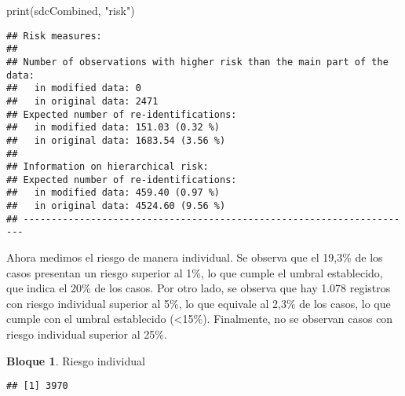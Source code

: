 \documentclass[
]{book}
\newenvironment{Shaded}{\begin{snugshade}}{\end{snugshade}}
\newcommand{\CommentTok}[1]{\textcolor[rgb]{0.56,0.35,0.01}{\textit{#1}}}
\newcommand{\FloatTok}[1]{\textcolor[rgb]{0.00,0.00,0.81}{#1}}
\newcommand{\FunctionTok}[1]{\textcolor[rgb]{0.00,0.00,0.00}{#1}}
\newcommand{\NormalTok}[1]{#1}
\newcommand{\SpecialCharTok}[1]{\textcolor[rgb]{0.00,0.00,0.00}{#1}}
\newcommand{\StringTok}[1]{\textcolor[rgb]{0.31,0.60,0.02}{#1}}
\theoremstyle{definition}
\theoremstyle{definition}
\newtheorem{example}{Bloque}[chapter]
\theoremstyle{definition}
\theoremstyle{definition}
\theoremstyle{remark}
\begin{document}
\begin{Shaded}
\begin{Highlighting}[]
\FunctionTok{print}\NormalTok{(sdcCombined, }\StringTok{"risk"}\NormalTok{)}
\end{Highlighting}
\end{Shaded}

\begin{verbatim}
## Risk measures:
## 
## Number of observations with higher risk than the main part of the data: 
##   in modified data: 0
##   in original data: 2471
## Expected number of re-identifications: 
##   in modified data: 151.03 (0.32 %)
##   in original data: 1683.54 (3.56 %)
## 
## Information on hierarchical risk:
## Expected number of re-identifications: 
##   in modified data: 459.40 (0.97 %)
##   in original data: 4524.60 (9.56 %)
## ----------------------------------------------------------------------
\end{verbatim}

Ahora medimos el riesgo de manera individual. Se observa que el 19,3\% de los casos presentan un riesgo superior al 1\%, lo que cumple el umbral establecido, que indica el 20\% de los casos. Por otro lado, se observa que hay 1.078 registros con riesgo individual superior al 5\%, lo que equivale al 2,3\% de los casos, lo que cumple con el umbral establecido (\textless15\%). Finalmente, no se observan casos con riesgo individual superior al 25\%.

\begin{example}
\protect\hypertarget{exm:bloque67nbm}{}\label{exm:bloque67nbm}Riesgo individual
\end{example}

\begin{Shaded}
\end{Shaded}

\begin{verbatim}
## [1] 3970
\end{verbatim}

\begin{Shaded}
\end{Shaded}
\end{document}

